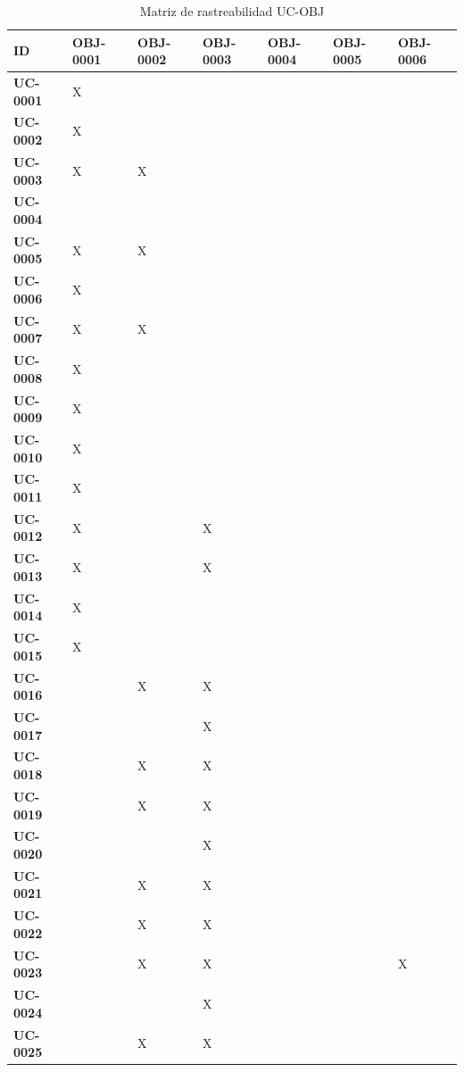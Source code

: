 \documentclass[11pt, a4paper]{article}
\begin{document}
{\begin{center}
{\small
\begin{longtable}{|p{2.2cm}|p{2.0cm}|p{2.0cm}|p{2.0cm}|p{2.0cm}|p{2.0cm}|p{2.0cm}|}
\caption{Matriz de rastreabilidad UC-OBJ} \label{tab:matriz-uc-obj} \\
\hline
\textbf{ID} & \textbf{OBJ-0001} & \textbf{OBJ-0002} & \textbf{OBJ-0003} & \textbf{OBJ-0004} & \textbf{OBJ-0005} & \textbf{OBJ-0006} \\
\hline
\hline
\endhead
\textbf{UC-0001} & X &  &  &  &  &  \\
\hline
\textbf{UC-0002} & X &  &  &  &  &  \\
\hline
\textbf{UC-0003} & X & X &  &  &  &  \\
\hline
\textbf{UC-0004} &  &  &  &  &  &  \\
\hline
\textbf{UC-0005} & X & X &  &  &  &  \\
\hline
\textbf{UC-0006} & X &  &  &  &  &  \\
\hline
\textbf{UC-0007} & X & X &  &  &  &  \\
\hline
\textbf{UC-0008} & X &  &  &  &  &  \\
\hline
\textbf{UC-0009} & X &  &  &  &  &  \\
\hline
\textbf{UC-0010} & X &  &  &  &  &  \\
\hline
\textbf{UC-0011} & X &  &  &  &  &  \\
\hline
\textbf{UC-0012} & X &  & X &  &  &  \\
\hline
\textbf{UC-0013} & X &  & X &  &  &  \\
\hline
\textbf{UC-0014} & X &  &  &  &  &  \\
\hline
\textbf{UC-0015} & X &  &  &  &  &  \\
\hline
\textbf{UC-0016} &  & X & X &  &  &  \\
\hline
\textbf{UC-0017} &  &  & X &  &  &  \\
\hline
\textbf{UC-0018} &  & X & X &  &  &  \\
\hline
\textbf{UC-0019} &  & X & X &  &  &  \\
\hline
\textbf{UC-0020} &  &  & X &  &  &  \\
\hline
\textbf{UC-0021} &  & X & X &  &  &  \\
\hline
\textbf{UC-0022} &  & X & X &  &  &  \\
\hline
\textbf{UC-0023} &  & X & X &  &  & X \\
\hline
\textbf{UC-0024} &  &  & X &  &  &  \\
\hline
\textbf{UC-0025} &  & X & X &  &  &  \\

\end{longtable}}
\end{center}}
\end{document}
